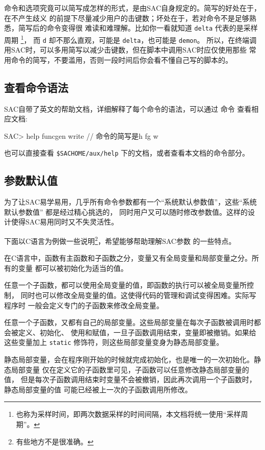 命令和选项究竟可以简写成怎样的形式，是由SAC自身规定的。简写的好处在于，在不产生歧义
的前提下尽量减少用户的击键数；坏处在于，若对命令不是足够熟悉，简写后的命令变得很
难读和难理解。比如你一看就知道 \texttt{delta} 代表的是采样周期
\footnote{也称为采样时间，即两次数据采样的时间间隔，本文档将统一使用``采样周期''。}，
而 \texttt{d} 却不那么直观，可能是 \texttt{delta}，也可能是 \texttt{demon}。
所以，在终端调用SAC时，可以多用简写以减少击键数，但在脚本中调用SAC时应仅使用那些
常用命令的简写，不要滥用，否则一段时间后你会看不懂自己写的脚本的。

\subsection{查看命令语法}
SAC自带了英文的帮助文档，详细解释了每个命令的语法，可以通过  命令
查看相应文档:
\begin{SACCode}
SAC> help funcgen write   // 命令的简写是h fg w
\end{SACCode}
也可以直接查看 \verb|$SACHOME/aux/help| 下的文档，或者查看本文档的命令部分。

\subsection{参数默认值}
为了让SAC易学易用，几乎所有命令参数都有一个``系统默认参数值''，这些``系统默认参数值''
都是经过精心挑选的，
同时用户又可以随时修改参数值。这样的设计使得SAC易用同时又不失灵活性。

下面以C语言为例做一些说明\footnote{有些地方不是很准确。}，希望能够帮助理解SAC参数
的一些特点。

在C语言中，函数有主函数和子函数之分，变量又有全局变量和局部变量之分。所有的变量
都可以被初始化为适当的值。

任意一个子函数，都可以使用全局变量的值，即函数的执行可以被全局变量所控制，
同时也可以修改全局变量的值。这使得代码的管理和调试变得困难。实际写程序时
一般会定义专门的子函数来修改全局变量。

任意一个子函数，又都有自己的局部变量。这些局部变量在每次子函数被调用时都会被定义、初始化、
使用和赋值，一旦子函数调用结束，变量即被撤销。如果给这些变量加上 \texttt{static}
修饰符，则这些局部变量变身为静态局部变量。

静态局部变量，会在程序刚开始的时候就完成初始化，也是唯一的一次初始化。静态局部变量
仅在定义它的子函数里可见，子函数可以任意修改静态局部变量的值，
但是每次子函数调用结束时变量不会被撤销，因此再次调用一个子函数时，静态局部变量的值
可能已经被上一次的子函数调用所修改。

